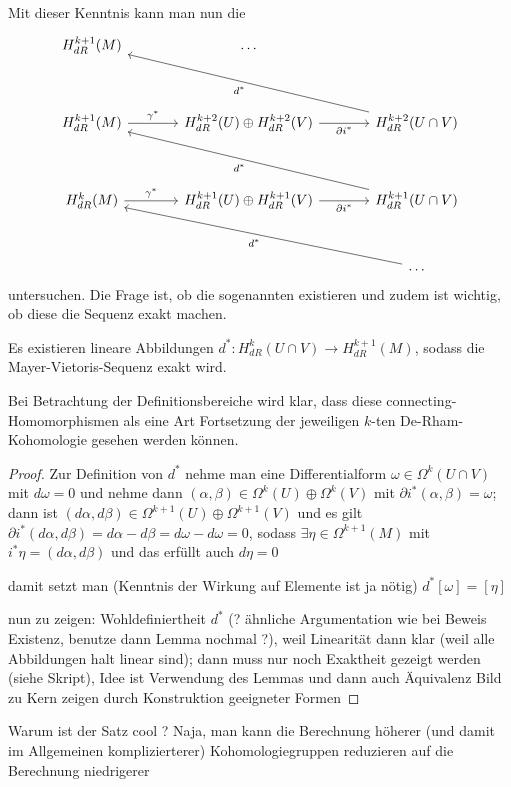 \documentclass[../H_Analysis_main.tex]{subfiles}
\begin{document}
Mit dieser Kenntnis kann man nun die 
$$
\begin{tikzcd}[row sep = 36, column sep = 36]
H_{dR}^{k + 1}(M) & \dots & 
\\
H_{dR}^{k + 1}(M) \arrow{r}{\gamma^*} & H_{dR}^{k + 2}(U) \oplus H_{dR}^{k + 2}(V) \arrow[swap]{r}{\partial i^*} & H_{dR}^{k + 2}(U \cap V)  \arrow{ull}{d^*}
\\
H_{dR}^k(M) \arrow{r}{\gamma^*} & H_{dR}^{k + 1}(U) \oplus H_{dR}^{k + 1}(V) \arrow[swap]{r}{\partial i^*} & H_{dR}^{k + 1}(U \cap V)  \arrow{ull}{d^*}
\\
 &  & \dots \arrow{ull}{d^*}
\end{tikzcd}
$$
untersuchen. Die Frage ist, ob die sogenannten  existieren und zudem ist wichtig, ob diese die Sequenz exakt machen.
\begin{satz}
Es existieren lineare Abbildungen $d^*: H_{dR}^k(U \cap V) \rightarrow H_{dR}^{k + 1}(M)$, sodass die Mayer-Vietoris-Sequenz exakt wird.
\end{satz}
Bei Betrachtung der Definitionsbereiche wird klar, dass diese connecting-Homomorphismen als eine Art Fortsetzung der jeweiligen $k$-ten De-Rham-Kohomologie gesehen werden können.
\begin{proof}
Zur Definition von $d^*$ nehme man eine Differentialform $\omega \in \Omega^k(U \cap V)$ mit $d\omega = 0$ und nehme dann $(\alpha, \beta) \in \Omega^k(U) \oplus \Omega^k(V)$ mit $\partial i^*(\alpha, \beta) = \omega$; dann ist $(d\alpha, d\beta) \in \Omega^{k + 1}(U) \oplus \Omega^{k + 1}(V)$ und es gilt $\partial i^*(d\alpha, d\beta) = d\alpha - d\beta = d\omega - d\omega = 0$, sodass $\exists \eta \in \Omega^{k + 1}(M)$ mit $i^*\eta = (d\alpha, d\beta)$ und das erfüllt auch $d\eta = 0$

damit setzt man (Kenntnis der Wirkung auf Elemente ist ja nötig) $d^* [\omega] = [\eta]$

nun zu zeigen: Wohldefiniertheit $d^*$ (? ähnliche Argumentation wie bei Beweis Existenz, benutze dann Lemma nochmal ?), weil Linearität dann klar (weil alle Abbildungen halt linear sind); dann muss nur noch Exaktheit gezeigt werden (siehe Skript), Idee ist Verwendung des Lemmas und dann auch Äquivalenz Bild zu Kern zeigen durch Konstruktion geeigneter Formen
\end{proof}

Warum ist der Satz cool ? Naja, man kann die Berechnung höherer (und damit im Allgemeinen komplizierterer) Kohomologiegruppen reduzieren auf die Berechnung niedrigerer
\end{document}
